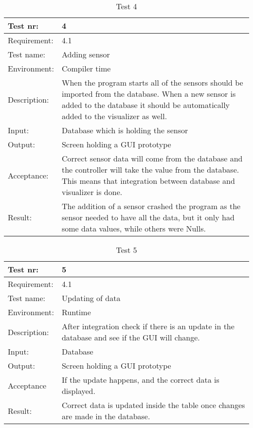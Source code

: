 \documentclass[../document.tex]{subfiles}
\begin{document}
\begin{table}[H]
\caption{Test 4}
\begin{tabularx}{\textwidth}{|l|X|}
\hline
Test nr:
&4
\\ \hline Requirement:
&4.1
\\ \hline Test name:
&Adding sensor
\\ \hline Environment:
&Compiler time
\\ \hline Description:
&When the program starts all of the sensors should be imported from the database. When a new sensor is added to the database it should be automatically added to the visualizer as well.
\\ \hline Input:
&Database which is holding the sensor
\\ \hline Output:
&Screen holding a GUI prototype
\\ \hline Acceptance:
&Correct sensor data will come from the database and the controller will take the value from the database. This means that integration between database and visualizer is done.
\\ \hline Result:
&The addition of a sensor crashed the program as the sensor needed to have all the data, but it only had some data values, while others were Nulls.
\\ \hline
\end{tabularx}
\end{table}

\begin{table}[H]
\caption{Test 5}
\begin{tabularx}{\textwidth}{|l|X|}
\hline
Test nr:
&5
\\ \hline Requirement:
&4.1
\\ \hline Test name:
&Updating of data
\\ \hline Environment:
&Runtime
\\ \hline Description:
&After integration check if there is an update in the database and see if the GUI will change.
\\ \hline Input:
&Database
\\ \hline Output:
&Screen holding a GUI prototype
\\ \hline Acceptance
&If the update happens, and the correct data is displayed.
\\ \hline Result:
&Correct data is updated inside the table once changes are made in the database.
\\ \hline
\end{tabularx}
\end{table}
\end{document}
